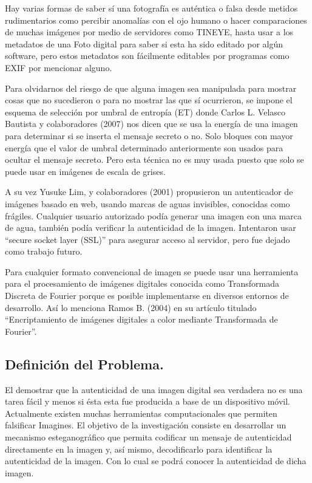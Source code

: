 \documentclass[12pt]{article}
\begin{document}
Hay varias formas de saber sí una fotografía es auténtica o falsa desde metidos rudimentarios como percibir anomalías con el ojo humano o hacer comparaciones de muchas imágenes por medio de servidores como TINEYE, hasta usar a los metadatos de una Foto digital para saber si esta ha sido editado por algún software, pero estos metadatos son fácilmente editables por programas como EXIF por mencionar alguno.

Para olvidarnos del riesgo de que alguna imagen sea manipulada para mostrar cosas que no sucedieron o para no mostrar las que sí ocurrieron, se impone el esquema de selección por umbral de entropía (ET) donde Carlos L. Velasco Bautista y colaboradores (2007) nos dicen que se usa la energía de una imagen para determinar si se inserta el mensaje secreto o no. Solo bloques con mayor energía que el valor de umbral determinado anteriormente son usados para ocultar el mensaje secreto. Pero esta técnica no es muy usada puesto que solo se puede usar en imágenes de escala de grises.\cite{Velasco}

A su vez Yusuke Lim, y colaboradores (2001) propusieron un autenticador de imágenes basado en web, usando marcas de aguas invisibles, conocidas como frágiles. Cualquier usuario autorizado podía generar una imagen con una marca de agua, también podía verificar la autenticidad de la imagen. Intentaron usar “secure socket layer (SSL)” para asegurar acceso al servidor, pero fue dejado como trabajo futuro. \cite{Yusuk}

Para cualquier formato convencional de imagen se puede usar una herramienta para el procesamiento de imágenes digitales conocida  como Transformada Discreta de Fourier porque es posible implementarse en diversos entornos de desarrollo. Así lo menciona Ramos B. (2004) en su artículo titulado “Encriptamiento de imágenes digitales a color mediante Transformada de Fourier”. \cite{Ramos}

\subsection{Definición del Problema.}
El demostrar que la autenticidad de una imagen digital sea verdadera no es una tarea fácil y menos si ésta esta fue producida a base de un dispositivo móvil. Actualmente existen muchas herramientas computacionales que permiten falsificar Imagines. El objetivo de la investigación consiste en desarrollar un mecanismo esteganográfico que permita codificar un mensaje de autenticidad directamente en la imagen y, así mismo, decodificarlo para identificar la autenticidad de la imagen. Con lo cual se podrá conocer la autenticidad de dicha imagen.
\end{document}
